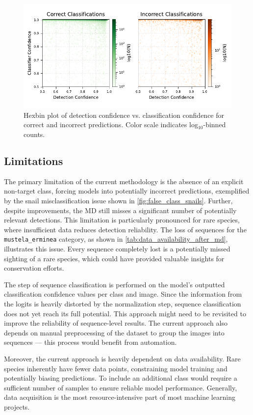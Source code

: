 \begin{figure}[ht]
\centering
\includegraphics{figures/pred_conf_hexbin.pdf}
\caption{Hexbin plot of detection confidence vs. classification confidence for correct and incorrect predictions. Color scale indicates log$_{10}$-binned counts.}
\label{fig:pred_conf_hexbin}
\end{figure}

\subsection{Limitations}
The primary limitation of the current methodology is the absence of an explicit non-target class, forcing models into potentially incorrect predictions, exemplified by the snail misclassification issue shown in \autoref{fig:false_class_snails}.
Further, despite improvements, the \ac{MD} still misses a significant number of potentially relevant detections.
This limitation is particularly pronounced for rare species, where insufficient data reduces detection reliability.
The loss of sequences for the \texttt{mustela\_erminea} category, as shown in \autoref{tab:data_availability_after_md}, illustrates this issue.
Every sequence completely lost is a potentially missed sighting of a rare species, which could have provided valuable insights for conservation efforts.

The step of sequence classification is performed on the model's outputted classification confidence values per class and image.
Since the information from the logits is heavily distorted by the normalization step, sequence classification does not yet reach its full potential.
This approach might need to be revisited to improve the reliability of sequence-level results.
The current approach also depends on manual preprocessing of the dataset to group the images into sequences --- this process would benefit from automation.

Moreover, the current approach is heavily dependent on data availability.
Rare species inherently have fewer data points, constraining model training and potentially biasing predictions.
To include an additional class would require a sufficient number of samples to ensure reliable model performance.
Generally, data acquisition is the most resource-intensive part of most machine learning projects.

